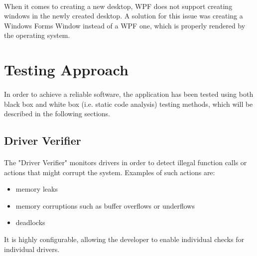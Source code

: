 		\paragraph{}
		 When it comes to creating a new desktop, WPF does not support creating windows in the newly created desktop. A solution for this issue was creating a Windows Forms Window instead of a WPF one, which is properly rendered by the operating system.
		
	\newpage
	\section{Testing Approach}
		\paragraph{}
		In order to achieve a reliable software, the application has been tested using both black box and white box (i.e. static code analysis) testing methods, which will be described in the following sections.
		
		\subsection{Driver Verifier}
		\paragraph{}
		The "Driver Verifier" monitors drivers in order to detect illegal function calls or actions that might corrupt the system\cite{MSDNDriverVerifier}. Examples of such actions are:
		\begin{itemize}
			\item memory leaks
			\item memory corruptions such as buffer overflows or underflows
			\item deadlocks
		\end{itemize}
	
		 It is highly configurable, allowing the developer to enable individual checks for individual drivers.
		
